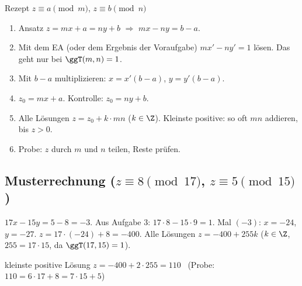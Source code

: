 \begin{rezept}{Rezept $z \equiv a \pmod m$, $z \equiv b \pmod n$}
\begin{enumerate}
\item Ansatz $z = m x + a = n y + b$ $\Rightarrow$ $m x - n y = b - a$.
\item Mit dem EA (oder dem Ergebnis der Voraufgabe) $m x' - n y' = 1$ lösen. Das geht nur bei $\ggT(m, n) = 1$.
\item Mit $b - a$ multiplizieren: $x = x'(b-a)$, $y = y'(b-a)$.
\item $z_0 = m x + a$. Kontrolle: $z_0 = n y + b$.
\item Alle Lösungen $z = z_0 + k \cdot m n$ ($k \in \Z$). Kleinste positive: so oft $mn$ addieren, bis $z > 0$.
\item Probe: $z$ durch $m$ und $n$ teilen, Reste prüfen.
\end{enumerate}
\end{rezept}

\subsection*{Musterrechnung ($z \equiv 8 \pmod{17}$, $z \equiv 5 \pmod{15}$)}
$17x - 15y = 5 - 8 = -3$. Aus Aufgabe 3: $17 \cdot 8 - 15 \cdot 9 = 1$. Mal $(-3)$: $x = -24$, $y = -27$.
$z = 17 \cdot (-24) + 8 = -400$. Alle Lösungen $z = -400 + 255k$ ($k \in \Z$, $255 = 17 \cdot 15$, da $\ggT(17, 15) = 1$).
\begin{ergebnis} kleinste positive Lösung $z = -400 + 2 \cdot 255 = 110$ \ (Probe: $110 = 6 \cdot 17 + 8 = 7 \cdot 15 + 5$) \end{ergebnis}
